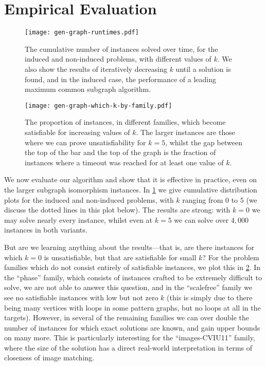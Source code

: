 \documentclass[letterpaper]{article}
\theoremstyle{definition}
\begin{document}
\section{Empirical Evaluation}\label{section:evaluation}

\begin{figure}[tb]
    \texttt{[image: gen-graph-runtimes.pdf]}
    \caption{The cumulative number of instances solved over time, for the induced and non-induced
    problems, with different values of $k$. We also show the results of iteratively decreasing $k$
    until a solution is found, and in the induced case, the performance of a leading maximum common
    subgraph algorithm.}\label{figure:runtimes}
\end{figure}

\begin{figure}[tb]
    \texttt{[image: gen-graph-which-k-by-family.pdf]}
    \caption{The proportion of instances, in different families, which become satisfiable for
    increasing values of $k$. The larger instances are those where we can prove unsatisfiability for
    $k = 5$, whilst the gap between the top of the bar and the top of the graph is the fraction of
    instances where a timeout was reached for at least one value of $k$.}\label{figure:which-k}
\end{figure}

We now evaluate our algorithm and show that it is effective in practice, even on the larger subgraph
isomorphism instances. In \cref{figure:runtimes} we give cumulative distribution plots for the
induced and non-induced problems, with $k$ ranging from $0$ to $5$ (we discuss the dotted lines in
this plot below). The results are strong: with $k = 0$ we may solve nearly every instance, whilst
even at $k = 5$ we can solve over $4,000$ instances in both variants.

But are we learning anything about the results---that is, are there instances for which $k = 0$ is
unsatisfiable, but that are satisfiable for small $k$? For the problem families which do not consist
entirely of satisfiable instances, we plot this in \cref{figure:which-k}. In the ``phase'' family,
which consists of instances crafted to be extremely difficult to solve, we are not able to answer
this question, and in the ``scalefree'' family we see no satisfiable instances with low but not zero
$k$ (this is simply due to there being many vertices with loops in some pattern graphs, but no loops
at all in the targets). However, in several of the remaining families we can over double the number
of instances for which exact solutions are known, and gain upper bounds on many more. This is
particularly interesting for the ``images-CVIU11'' family, where the size of the solution has a
direct real-world interpretation in terms of closeness of image matching.
\end{document}
